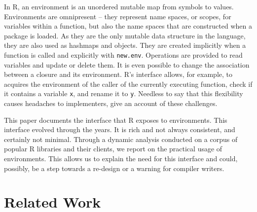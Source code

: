 \documentclass[10pt,sigplan,authorversion=true]{acmart}
\renewcommand{\c}[1]{\lstinline |#1|\xspace}
\begin{document}
In R, an environment is an unordered mutable map from symbols to values.
Environments are omnipresent -- they represent name spaces, or scopes, for
variables within a function, but also the name spaces that are constructed when
a package is loaded. As they are the only mutable data structure in the language,
they are also used as hashmaps and objects. They are created implicitly when a
function is called and explicitly with \c{new.env}. Operations are provided to
read variables and update or delete them. It is even possible to change the
association between a closure and its environment. R's interface allows, for
example, to acquires the environment of the caller of the currently executing
function, check if it contains a variable \c{x}, and rename it to \c{y}.
Needless to say that this flexibility causes headaches to implementers,
\citet{dls19} give an account of these challenges.

This paper documents the interface that R exposes to environments. This
interface evolved through the years. It is rich and not always consistent, and
certainly not minimal. Through a dynamic analysis conducted on a corpus of
popular R libraries and their clients, we report on the practical usage of
environments. This allows us to explain the need for this interface and could,
possibly, be a step towards a re-design or a warning for compiler writers.

\newpage

\section{Related Work}
\end{document}
